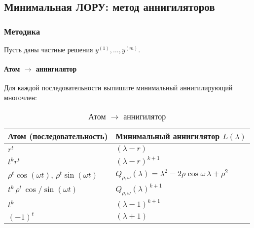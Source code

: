 \subsection{Минимальная ЛОРУ: метод аннигиляторов}\label{subsec:min-lre}


\subsubsection*{Методика}

Пусть даны частные решения $y^{(1)},\ldots,y^{(m)}$.

\paragraph{Атом $\to$ аннигилятор}
Для каждой последовательности выпишите минимальный аннигилирующий многочлен:
\begin{table}[h!]
\centering
\caption{Атом $\to$ аннигилятор}
\label{tab:atom-to-annihilator}
\begin{tabular}{|l|l|}
\hline
\textbf{Атом (последовательность)} & \textbf{Минимальный аннигилятор $L(\lambda)$} \\
\hline
$r^t$ & $(\lambda - r)$ \\
\hline
$t^k r^t$ & $(\lambda - r)^{k+1}$ \\
\hline
$\rho^t \cos(\omega t)$, $\rho^t \sin(\omega t)$ & $Q_{\rho,\omega}(\lambda)=\lambda^2-2\rho\cos\omega\,\lambda+\rho^2$ \\
\hline
$t^k \, \rho^t \, \cos/\sin(\omega t)$ & $Q_{\rho,\omega}(\lambda)^{k+1}$ \\
\hline
$t^k$ & $(\lambda-1)^{k+1}$ \\
\hline
$(-1)^t$ & $(\lambda+1)$ \\
\hline
\end{tabular}
\end{table}

